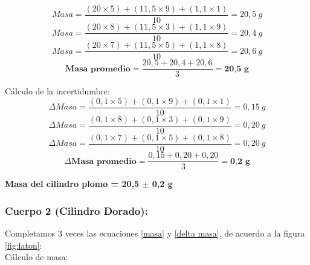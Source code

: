 \documentclass[10pt]{article}
\begin{document}
\begin{equation*} 
    Masa = \frac{(20\times5)+(11,5\times9)+(1,1\times1)}{10} = 20,5~g
\end{equation*}
\begin{equation*}
    Masa = \frac{(20\times8)+(11,5\times3)+(1,1\times9)}{10} = 20,4~g
\end{equation*}
\begin{equation*}
    Masa = \frac{(20\times7)+(11,5\times5)+(1,1\times8)}{10} = 20,6~g
\end{equation*}
\vspace{0.2cm}
\begin{equation*}
    \textbf{Masa~promedio}= \frac{20,5+20,4+20,6}{3} = \textbf{20,5~g}
\end{equation*}
\vspace{0.1cm}

Cálculo de la incertidumbre:
\begin{equation*}
     \Delta Masa =\frac{(0,1\times5)+(0,1\times9)+(0,1\times1)}{10} = 0,15~g
\end{equation*}
\begin{equation*}
     \Delta Masa =\frac{(0,1\times8)+(0,1\times3)+(0,1\times9)}{10} = 0,20~g
\end{equation*}
\begin{equation*}
     \Delta Masa =\frac{(0,1\times7)+(0,1\times5)+(0,1\times8)}{10} = 0,20~g
\end{equation*}
\vspace{0.2cm}
\begin{equation*}
    \Delta \textbf{Masa~promedio} = \frac{0,15+0,20+0,20}{3} = \textbf{0,2~g}
\end{equation*}

\vspace{0.3cm}
\begin{center}
    \textbf{Masa del cilindro plomo = 20,5 $\pm$ 0,2 g}
\end{center}

\subsubsection{Cuerpo 2 (Cilindro Dorado):}
\vspace{0,2cm}

Completamos 3 veces las ecuaciones \ref{masa} y \ref{delta masa}, de acuerdo a la figura \ref{fig:laton}:\\

Cálculo de masa:
\end{document}
